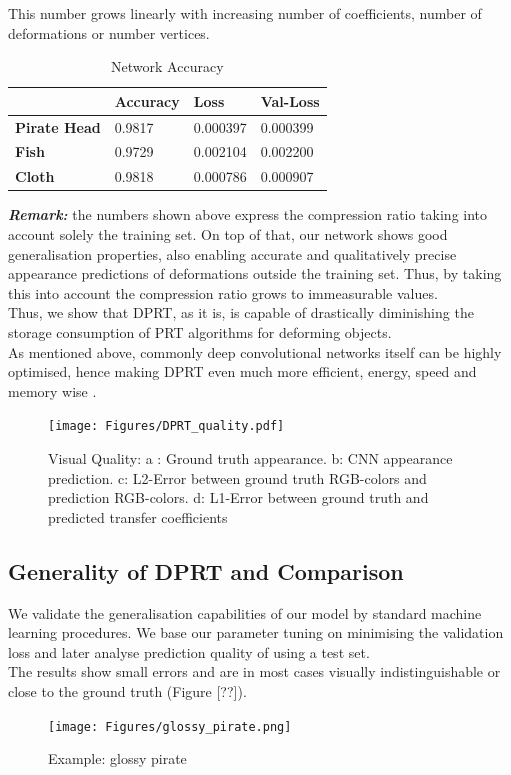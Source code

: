 This number grows linearly with increasing number of coefficients, number of deformations or number vertices. 
\begin{table}[H]
\begin{tabular}{|l|l|l|l|l|}
\hline
\textbf{}            & \textbf{Accuracy} & \textbf{Loss} & \multicolumn{2}{l|}{\textbf{Val-Loss}} \\ \hline
\textbf{Pirate Head} & 0.9817            & 0.000397            & \multicolumn{2}{l|}{0.000399}                 \\ \hline
\textbf{Fish}        & 0.9729            & 0.002104            & \multicolumn{2}{l|}{0.002200}                 \\ \hline
\textbf{Cloth}       & 0.9818            & 0.000786            & \multicolumn{2}{l|}{0.000907}                 \\ \hline
\end{tabular}
\caption{Network Accuracy}
\label{Table: NN_Accuracy}
\end{table}
\textit{\textbf{Remark:}} the numbers shown above express the compression ratio taking into account solely the training set. On top of that, our network shows good generalisation properties, also enabling accurate and qualitatively precise appearance predictions of deformations outside the training set. Thus, by taking this into account the compression ratio grows to immeasurable values. 
\\
Thus, we show that DPRT, as it is, is capable of drastically diminishing the storage consumption of PRT algorithms for deforming objects. 
\\
As mentioned above, commonly deep convolutional networks itself can be highly optimised, hence making DPRT even much more efficient, energy, speed and memory wise \cite{Survey_NN_Compression}. 
\begin{figure}[b]
  \centering
    \texttt{[image: Figures/DPRT\_quality.pdf]}
     \caption{Visual Quality:
     a : Ground truth appearance. b: CNN appearance prediction. c: L2-Error between ground truth RGB-colors and prediction RGB-colors. d: L1-Error between ground truth and predicted transfer coefficients }
     \label{Fig: DPRT_Quality}
\end{figure}
\subsection*{Generality of DPRT and Comparison}
We validate the generalisation capabilities of our model by standard machine learning procedures. We base our parameter tuning on minimising the validation loss and later analyse prediction quality of using a test set.\\ 
The results show small errors and are in most cases visually indistinguishable or close to the ground truth (Figure [??]). 
\begin{figure}[H]
  \centering
    \texttt{[image: Figures/glossy\_pirate.png]}
     \caption{Example: glossy pirate}
     \label{Fig: glossy_pirate}
\end{figure}
